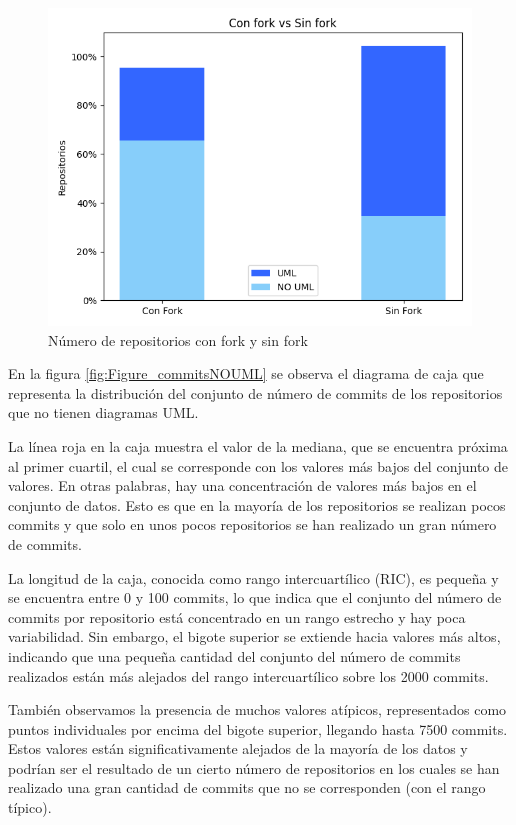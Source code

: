 \documentclass[a4paper, 12pt]{book}
\begin{document}
\begin{figure}
  \centering
  \includegraphics[width=12cm, keepaspectratio]{img/Figure_fork.png}
  \caption{Número de repositorios con fork y sin fork}\label{fig:Figure_fork}
\end{figure}

En la figura \ref{fig:Figure_commitsNOUML} se observa el diagrama de caja que representa la distribución del conjunto de número de commits de los repositorios que no tienen diagramas UML.


La línea roja en la caja muestra el valor de la mediana, que se encuentra próxima al primer cuartil, el cual se corresponde con los valores más bajos del conjunto de valores. 
En otras palabras, hay una concentración de valores más bajos en el conjunto de datos. 
Esto es que en la mayoría de los repositorios se realizan pocos commits y que solo en unos pocos repositorios se han realizado un gran número de commits.


La longitud de la caja, conocida como rango intercuartílico (RIC), es pequeña y se encuentra entre 0 y 100 commits, lo que indica que el conjunto del número de commits por repositorio está concentrado en un rango estrecho y hay poca variabilidad.
Sin embargo, el bigote superior se extiende hacia valores más altos, indicando que una pequeña cantidad del conjunto del número de commits realizados están más alejados del rango intercuartílico sobre los 2000 commits.


También observamos la presencia de muchos valores atípicos, representados como puntos individuales por encima del bigote superior, llegando hasta 7500 commits. 
Estos valores están significativamente alejados de la mayoría de los datos y podrían ser el resultado de un cierto número de repositorios en los cuales se han realizado una gran cantidad de commits que no se corresponden (con el rango típico). 
\end{document}
